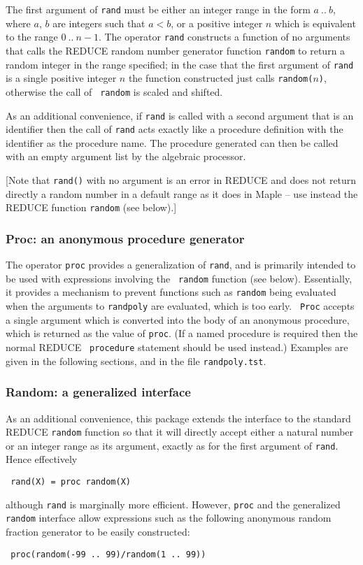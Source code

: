 The first argument of {\tt rand} must be either an integer range in
the form $a~..~b$, where $a$, $b$ are integers such that $a < b$, or a
positive integer $n$ which is equivalent to the range $0~..~n-1$.  The
operator {\tt rand} constructs a function of no arguments that calls
the REDUCE random number generator function {\tt random} to return a
random integer in the range specified; in the case that the first
argument of {\tt rand} is a single positive integer $n$ the function
constructed just calls {\tt random($n$)}, otherwise the call of {\tt
random} is scaled and shifted.

As an additional convenience, if {\tt rand} is called with a second
argument that is an identifier then the call of {\tt rand} acts
exactly like a procedure definition with the identifier as the
procedure name.  The procedure generated can then be called with an
empty argument list by the algebraic processor.

[Note that {\tt rand()} with no argument is an error in REDUCE and
does not return directly a random number in a default range as it does
in Maple -- use instead the REDUCE function {\tt random} (see below).]


\subsubsection{Proc: an anonymous procedure generator}

The operator {\tt proc} provides a generalization of {\tt rand}, and
is primarily intended to be used with expressions involving the {\tt
random} function (see below).  Essentially, it provides a mechanism to
prevent functions such as {\tt random} being evaluated when the
arguments to {\tt randpoly} are evaluated, which is too early.  {\tt
Proc} accepts a single argument which is converted into the body of an
anonymous procedure, which is returned as the value of {\tt proc}.
(If a named procedure is required then the normal REDUCE {\tt
procedure} statement should be used instead.)  Examples are given in
the following sections, and in the file {\tt randpoly.tst}.


\subsubsection{Random: a generalized interface}

As an additional convenience, this package extends the interface to
the standard REDUCE {\tt random} function so that it will directly
accept either a natural number or an integer range as its argument,
exactly as for the first argument of {\tt rand}.  Hence effectively
\begin{center}\tt
  rand(X) = proc random(X)
\end{center}
although {\tt rand} is marginally more efficient.  However, {\tt proc}
and the generalized {\tt random} interface allow expressions such as
the following anonymous random fraction generator to be easily
constructed:
\begin{center}\tt
  proc(random(-99~..~99)/random(1~..~99))
\end{center}


